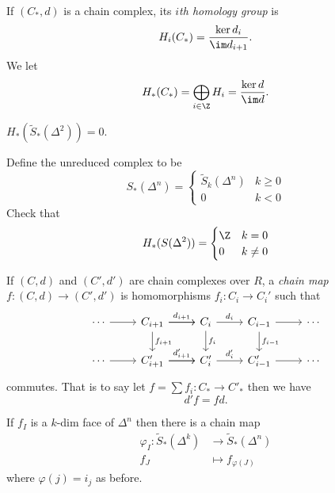 \documentclass[a4paper]{article}
\begin{document}
\begin{definition}
  If \((C_*, d)\) is a chain complex, its \emph{\(i\)th homology group} is
  \[
    H_i(C_*) = \frac{\ker d_i}{\im d_{i + 1}}.
  \]
  We let
  \[
    H_*(C_*) = \bigoplus_{i \in \Z} H_i = \frac{\ker d}{\im d}.
  \]
\end{definition}

\begin{eg}
  \(H_*(\widetilde S_*(\Delta^2)) = 0\).
\end{eg}

\begin{eg}
  Define the unreduced complex to be
  \[
    S_*(\Delta^n) =
    \begin{cases}
      \widetilde S_k(\Delta^n) & k \geq 0 \\
      0 & k < 0
    \end{cases}
  \]
  Check that
  \[
    H_*(S(\Delta^2)) =
    \begin{cases}
      \Z & k = 0 \\
      0 & k \neq 0
    \end{cases}
  \]
\end{eg}

\begin{definition}
  If \((C, d)\) and \((C', d')\) are chain complexes over \(R\), a \emph{chain map} \(f: (C, d) \to (C', d')\) is homomorphisms \(f_i: C_i \to C_i'\) such that
  \[
    \begin{tikzcd}
      \cdots \ar[r] & \ar[r] C_{i + 1} \ar[r, "d_{i + 1}"] \ar[d, "f_{i + 1}"] & C_i \ar[r, "d_i"] \ar[d, "f_i"] & C_{i - 1} \ar[r] \ar[d, "f_{i - 1}"] & \cdots \\
      \cdots \ar[r] & \ar[r] C'_{i + 1} \ar[r, "d'_{i + 1}"] & C'_i \ar[r, "d'_i"] & C'_{i - 1} \ar[r] & \cdots
    \end{tikzcd}
  \]
  commutes. That is to say let \(f = \sum f_i: C_* \to C'_*\) then we have
  \[
    d'f = fd.
  \]
\end{definition}

\begin{eg}
  If \(f_I\) is a \(k\)-dim face of \(\Delta^n\) then there is a chain map
  \begin{align*}
    \varphi_I: \widetilde S_*(\Delta^k) &\to \widetilde S_*(\Delta^n) \\
    f_J &\mapsto f_{\varphi(J)}
  \end{align*}
  where \(\varphi(j) = i_j\) as before.
\end{eg}
\end{document}
